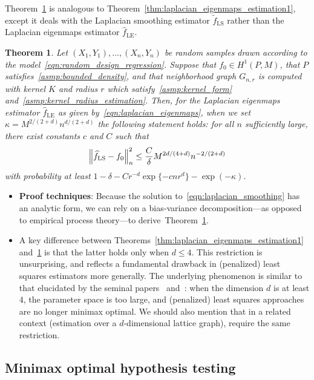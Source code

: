\documentclass{article}
\newcommand{\1}{\mathbf{1}}
\newcommand{\wt}[1]{\widetilde{#1}}
\newcommand{\wh}[1]{\widehat{#1}}
\newcommand{\LE}{\mathrm{LE}}
\newcommand{\LS}{\mathrm{LS}}
\theoremstyle{alden}
\theoremstyle{aldenthm}
\newtheorem{theorem}{Theorem}
\theoremstyle{definition}
\theoremstyle{remark}
\begin{document}
Theorem~\ref{thm:laplacian_smoothing_estimation1} is analogous to Theorem~\ref{thm:laplacian_eigenmaps_estimation1}, except it deals with the Laplacian smoothing estimator $\wt{f}_{\LS}$ rather than the Laplacian eigenmaps estimator $\wh{f}_{\LE}$.   
\begin{theorem}
	\label{thm:laplacian_smoothing_estimation1}
	Let $(X_1,Y_1),\ldots,(X_n,Y_n)$ be random samples drawn according to the model~\eqref{eqn:random_design_regression}. Suppose that $f_0 \in H^1(P,M)$, that $P$ satisfies~\ref{asmp:bounded_density}, and that neighborhood graph $G_{n,r}$ is computed with kernel $K$ and radius $r$ which satisfy~\ref{asmp:kernel_form} and~\ref{asmp:kernel_radius_estimation}. Then, for the Laplacian eigenmaps estimator $\wh{f}_{\LE}$ as given by~\eqref{eqn:laplacian_eigenmaps}, when we set $\kappa = M^{2/(2 + d)}n^{d/(2 + d)}$ the following statement holds: for all $n$ sufficiently large, there exist constants $c$ and $C$ such that
	\begin{equation*}
	\Bigl\|\wh{f}_{\LS} - f_0\Bigr\|_n^2 \leq \frac{C}{\delta} M^{2d/(4 + d)} n^{-2/(2 + d)}
	\end{equation*}
	with probability at least $1 - \delta -  Cr^{-d}\exp\{-cnr^d\} - \exp(-\kappa)$.
\end{theorem}

\begin{itemize}
	\item \textbf{Proof techniques}: Because the solution to~\eqref{eqn:laplacian_smoothing} has an analytic form, we can rely on a bias-variance decomposition---as opposed to empirical process theory---to derive~Theorem~\ref{thm:laplacian_smoothing_estimation1}.
	\item A key difference between Theorems~\ref{thm:laplacian_eigenmaps_estimation1} and~\ref{thm:laplacian_smoothing_estimation1} is that the latter holds only when $d \leq 4$. This restriction is unsurprising, and reflects a fundamental drawback in (penalized) least squares estimators more generally. The underlying phenomenon is similar to that elucidated by the seminal papers~\cite{birge1993} and~\cite{birge1998}: when the dimension $d$ is at least $4$, the parameter space is too large, and (penalized) least squares approaches are no longer minimax optimal. We should also mention that in a related context (estimation over a $d$-dimensional lattice graph), \cite{sadhanala2016} require the same restriction. 
\end{itemize}

\subsection{Minimax optimal hypothesis testing}
\end{document}
